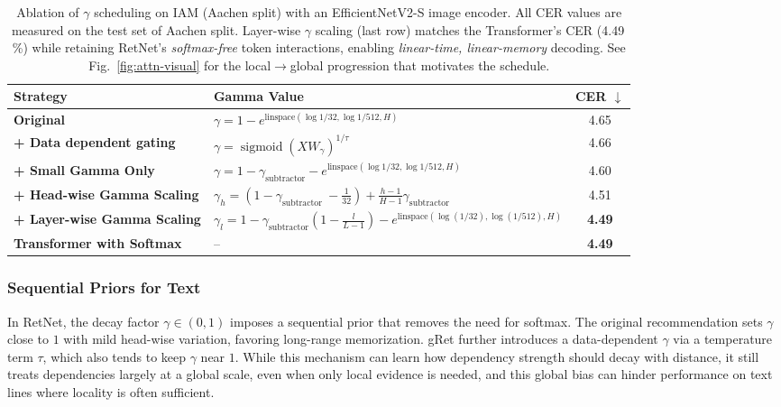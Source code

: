 \documentclass[times, review, 10pt]{elsarticle}
\begin{document}
\begin{table}[t]
\centering
\caption{Ablation of $\gamma$ scheduling on IAM (Aachen split) with an EfficientNetV2-S image encoder. All CER values are measured on the test set of Aachen split. Layer-wise $\gamma$ scaling (last row) matches the Transformer’s CER (4.49\,\%) while retaining RetNet’s \emph{softmax-free} token interactions, enabling \emph{linear-time, linear-memory} decoding. See Fig.~\ref{fig:attn-visual} for the local$\rightarrow$global progression that motivates the schedule.}
\fontsize{9pt}{10pt}\selectfont %

\setlength{\tabcolsep}{6pt} %
\renewcommand{\arraystretch}{1.3} %

\begin{tabular}{@{}l l c@{}}
\toprule
\textbf{Strategy} & \textbf{Gamma Value} & \textbf{CER} $\downarrow$ \\
\midrule
\textbf{Original} &
$\gamma = 1 - e^{\text{linspace}(\log 1 / 32, \log 1 / 512, H)}$ & 4.65 \\
\textbf{+ Data dependent gating} &
$\gamma=\operatorname{sigmoid}(X W_\gamma)^{1 / \tau}$ & 4.66 \\
\textbf{+ Small Gamma Only} &
$\gamma = 1 - \gamma_{\text{subtractor}} - e^{\text{linspace}(\log 1 / 32, \log 1 / 512, H)}$ & 4.60 \\
\textbf{+ Head-wise Gamma Scaling} &
$\gamma_h=\left(1-\gamma_{\text {subtractor }}-\frac{1}{32}\right)+\frac{h-1}{H-1} \gamma_{\text {subtractor }}$ & 4.51 \\
\textbf{+ Layer-wise Gamma Scaling} &
$\gamma_l = 1 - \gamma_{\text{subtractor}}\!\left(1 - \frac{l}{L-1}\right) - e^{\text{linspace}(\log(1/32), \log(1/512), H)}$ & \textbf{4.49} \\
\textbf{Transformer with Softmax} & -- & \textbf{4.49} \\
\bottomrule
\end{tabular}
\label{tab:gamma_cer_comparison}
\end{table}

\subsubsection{Sequential Priors for Text}
\label{sec:seq_priors_text}
In RetNet, the decay factor $\gamma \in (0,1)$ imposes a sequential prior that removes the need for softmax. The original recommendation sets $\gamma$ close to $1$ with mild head-wise variation, favoring long-range memorization. gRet further introduces a data-dependent $\gamma$ via a temperature term $\tau$, which also tends to keep $\gamma$ near $1$. While this mechanism can learn how dependency strength should decay with distance, it still treats dependencies largely at a global scale, even when only local evidence is needed, and this global bias can hinder performance on text lines where locality is often sufficient.
\end{document}

